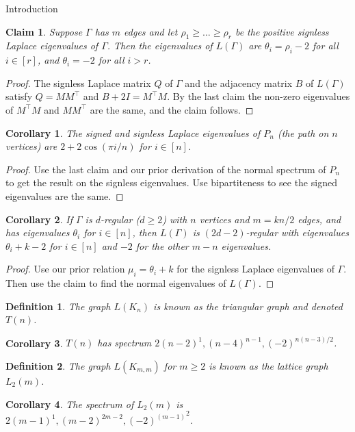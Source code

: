 \documentclass{article}
\newtheorem{claim}{Claim}
\newtheorem{cor}{Corollary}
\newtheorem{defn}{Definition}
\begin{document}
\begin{section}{Introduction}
   \begin{claim}
     Suppose $\Gamma$ has $m$ edges and let $\rho_1 \geq \ldots \geq \rho_r$ be the positive signless Laplace eigenvalues of $\Gamma$.
     Then the eigenvalues of $L(\Gamma)$ are $\theta_i = \rho_i - 2$ for all $i \in [r]$, and $\theta_i = -2$ for all $i > r$.
   \end{claim}
   \begin{proof}
     The signless Laplace matrix $Q$ of $\Gamma$ and the adjacency matrix $B$ of $L(\Gamma)$ satisfy $Q = MM^\intercal$ and $B+2I = M^\intercal M$.
     By the last claim the non-zero eigenvalues of $M^\intercal M$ and $MM^\intercal$ are the same,  and the claim follows.
   \end{proof}
   \begin{cor}
     The signed and signless Laplace eigenvalues of $P_n$ (the path on $n$ vertices) are $2+2\cos(\pi i/n)$ for $i \in [n]$.
   \end{cor}
   \begin{proof}
     Use the last claim and our prior derivation of the normal spectrum of $P_n$ to get the result on the signless eigenvalues.
     Use bipartiteness to see the signed eigenvalues are the same.
   \end{proof}
   \begin{cor}
     If $\Gamma$ is $d$-regular ($d \geq 2$) with $n$ vertices and $m = kn/2$ edges, and has eigenvalues $\theta_i$ for $i \in [n]$, then $L(\Gamma)$ is $(2d-2)$-regular with eigenvalues $\theta_i+k-2$ for $i \in [n]$ and $-2$ for the other $m-n$ eigenvalues.
   \end{cor}
   \begin{proof}
     Use our prior relation $\mu_i = \theta_i+k$ for the signless Laplace eigenvalues of $\Gamma$.
     Then use the claim to find the normal eigenvalues of $L(\Gamma)$.
   \end{proof}

   \begin{defn}
     The graph $L(K_n)$ is known as the \emph{triangular graph} and denoted $T(n)$.
   \end{defn}
   \begin{cor}
   $T(n)$ has spectrum $2(n-2)^1, (n-4)^{n-1}, (-2)^{n(n-3)/2}$.
   \end{cor}

   \begin{defn}
     The graph $L(K_{m,m})$ for $m \geq 2$ is known as the \emph{lattice graph} $L_2(m)$.
   \end{defn}
   \begin{cor}
     The spectrum of $L_2(m)$ is $2(m-1)^1,(m-2)^{2m-2},{(-2)^{(m-1)}}^2$.
   \end{cor}


\end{section}
\end{document}
